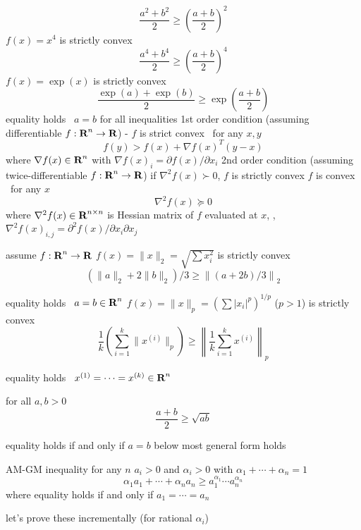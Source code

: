 \documentclass[17pt,landscape]{foils}
\begin{document}
\[
\frac{a^2 + b^2}{2}
\geq
\left(\frac{a+b}{2}\right)^2
\]
\vitem $f(x)=x^4$ is strictly convex
\[
\frac{a^4 + b^4}{2}
\geq
\left(\frac{a+b}{2}\right)^4
\]
\vitem $f(x)=\exp(x)$ is strictly convex
\[
\frac{\exp(a) + \exp(b)}{2}
\geq
\exp\left(\frac{a+b}{2}\right)
\]
\vvitem equality holds \iaoi\ $a=b$ for all inequalities
\eit
{}
\bit
\vitem
1st order condition (assuming differentiable $f:\mbox{\bf R}^n\to\mbox{\bf R}$)
- $f$ is strict convex \iaoi\ for any $x,y$
\[
f(y) > f(x) + \nabla f(x)^T (y-x)
\]
where $\nabla f(x) \in\mbox{\bf R}^{n}$ with $\nabla f(x)_{i} = \partial f(x) / \partial x_i$
\vitem
2nd order condition (assuming twice-differentiable $f:\mbox{\bf R}^n\to\mbox{\bf R}$)
\bit
\vitem
if $\nabla^2 f(x) \succ 0$, $f$ is strictly convex
\vitem
$f$ is convex \iaoi\ for any $x$
\[
\nabla^2 f(x)\succeq 0
\]
\eit
where $\nabla^2 f(x) \in\mbox{\bf R}^{n\times n}$
is Hessian matrix of $f$ evaluated at $x$,
\ie,
$\nabla^2 f(x)_{i,j} = \partial^2 f(x) / \partial x_i \partial x_j$
\eit
\vfill
{}
\bit
\item assume $f:\mbox{\bf R}^n\to\mbox{\bf R}$
\vitem $f(x)=\|x\|_2 = \sqrt{\sum x_i^2}$ is strictly convex
\[
(\|a\|_2 + 2\|b\|_2 )/3
\geq
\left\|(a+2b)/3\right\|_2
\]
\bit
\item equality holds \iaoi\ $a=b\in\mbox{\bf R}^n$
\eit
\vitem $f(x)=\|x\|_p = \left(\sum |x_i|^p\right)^{1/p}$ ($p>1$) is strictly convex
\[
\frac{1}{k}
\left(\sum_{i=1}^k\|x^{(i)}\|_p \right)
\geq
\left\|\frac{1}{k}\sum_{i=1}^k x^{(i)}\right\|_p
\]
\bit
\item equality holds \iaoi\ $x^{(1)}=\cdots=x^{(k)}\in\mbox{\bf R}^n$
\eit
\eit
{}
\bit
\item
for all $a,b>0$
\[
\frac{a + b}{2} \geq \sqrt{ab}
\]
\bit
\item
equality holds if and only if $a=b$
\eit
\vitem
below most general form holds
\eit
\begin{myinequality}{AM-GM inequality}
for any $n$ $a_i>0$ and $\alpha_i>0$ with $\alpha_1+\cdots+\alpha_n=1$
\[
\alpha_1 a_1 + \cdots + \alpha_n a_n
\geq
{a_1^{\alpha_1} \cdots a_n^{\alpha_n}}
\]
where equality holds if and only if $a_1=\cdots=a_n$
\end{myinequality}
\bit
\item
let's prove these incrementally
(for rational $\alpha_i$)
\eit
\vfill
{}
\end{document}
